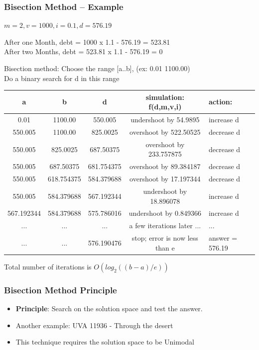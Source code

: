 \documentclass{beamer}
\begin{document}
\begin{frame}
  \frametitle{Bisection Method -- Example}
{\smaller
\begin{block}{}
$m = 2, v = 1000, i = 0.1, d = 576.19$

\medskip

After one Month, debt = 1000 x 1.1 - 576.19 = 523.81\\
After two Months, debt = 523.81 x 1.1 - 576.19 = 0
\end{block}

Bisection method: Choose the range [a..b], (ex: 0.01 1100.00)\\
Do a binary search for d in this range
}

\medskip

{\tiny
\begin{tabular}{c|c|c|c|l}
 a & b & d & simulation: f(d,m,v,i) & action: \\
 \hline
 0.01 & 1100.00 & 550.005 & undershoot by 54.9895 & increase d\\
 550.005 & 1100.00 & 825.0025 & overshoot by 522.50525 & decrease d\\
 550.005 & 825.0025 & 687.50375 & overshoot by 233.757875 & decrease d\\
 550.005 & 687.50375 & 681.754375 & overshoot by 89.384187 & decrease d\\
 550.005 & 618.754375 & 584.379688 & overshoot by 17.197344 & decrease d\\
 550.005 & 584.379688 & 567.192344 & undershoot by 18.896078 & increase d\\
 567.192344 & 584.379688 & 575.786016 & undershoot by 0.849366 & increase d\\
 ... & ... & ... & a few iterations later ... & ...\\
 ... & ... & 576.190476 & stop; error is now less than e & answer = 576.19\\
\end{tabular}
}

\medskip

Total number of iterations is $O(log_2((b-a)/e))$
\end{frame}

\begin{frame}
  \frametitle{Bisection Method Principle}

  \begin{itemize}
  \item {\bf Principle}: Search on the solution space and test the answer.
    \bigskip

  \item Another example: UVA 11936 - Through the desert
    \bigskip

  \item This technique requires the solution space to be \alert{Unimodal}
  \end{itemize}
\end{frame}
\end{document}
